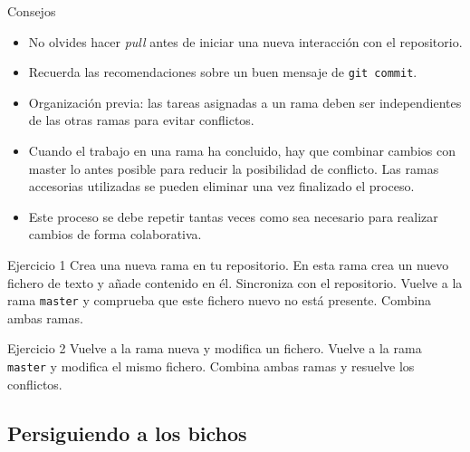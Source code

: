 \documentclass[xcolor={usenames,svgnames,dvipsnames}]{beamer}
\begin{document}
\begin{frame}[label={sec:orgd9291c7},fragile]{Consejos}
 \begin{itemize}
\item \alert{No olvides hacer \emph{pull} antes de iniciar una nueva interacción con el repositorio}.

\item Recuerda las recomendaciones sobre un buen mensaje de \texttt{git commit}.

\item \alert{Organización previa}: las \alert{tareas} asignadas a un rama deben ser \alert{independientes} de las otras ramas para evitar conflictos.

\item Cuando el trabajo en una rama ha concluido, hay que \alert{combinar cambios con master lo antes posible} para reducir la posibilidad de conflicto. Las ramas accesorias utilizadas se pueden eliminar una vez finalizado el proceso.

\item Este proceso se debe repetir tantas veces como sea necesario para realizar cambios de forma colaborativa.
\end{itemize}
\end{frame}
\begin{frame}[label={sec:orgf0b63ad},fragile]{}
 \begin{block}{Ejercicio 1}
Crea una nueva rama en tu repositorio. En esta rama crea un nuevo fichero de texto y añade contenido en él. Sincroniza con el repositorio. Vuelve a la rama \texttt{master} y comprueba que este fichero nuevo no está presente. Combina ambas ramas.
\end{block}

\begin{block}{Ejercicio 2}
Vuelve a la rama nueva y modifica un fichero. Vuelve a la rama \texttt{master} y modifica el mismo fichero. Combina ambas ramas y resuelve los conflictos.
\end{block}
\end{frame}
\subsection{Persiguiendo a los bichos}
\label{sec:orgdfdd031}
\end{document}
